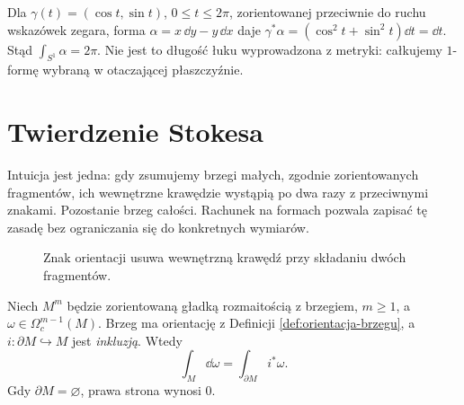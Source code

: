 \begin{przyklad}
Dla $\gamma(t)=(\cos t,\sin t)$, $0\leq t\leq2\pi$,
zorientowanej przeciwnie do ruchu wskazówek zegara,
forma $\alpha=x\,\dd y-y\,\dd x$ daje
$\gamma^*\alpha=(\cos^2t+\sin^2t)\dd t=\dd t$.
Stąd $\int_{S^1}\alpha=2\pi$.
Nie jest to długość łuku wyprowadzona z metryki:
całkujemy $1$-formę wybraną w otaczającej płaszczyźnie.
\end{przyklad}

\section{Twierdzenie Stokesa}
\label{sec:formy-stokes}

Intuicja jest jedna: gdy zsumujemy brzegi
małych, zgodnie zorientowanych fragmentów,
ich wewnętrzne krawędzie wystąpią po dwa razy
z przeciwnymi znakami. Pozostanie brzeg całości.
Rachunek na formach pozwala zapisać tę zasadę
bez ograniczania się do konkretnych wymiarów.

\begin{figure}[!htbp]
\centering
{}
\caption{Znak orientacji usuwa wewnętrzną krawędź
przy składaniu dwóch fragmentów.}
\label{fig:stokes-anulowanie}
\end{figure}

\begin{twierdzenie}
\label{thm:stokes-formy}
Niech $M^m$ będzie zorientowaną gładką rozmaitością
z brzegiem, $m\geq1$, a $\omega\in\Omega_c^{m-1}(M)$.
Brzeg ma orientację z Definicji
\ref{def:orientacja-brzegu}, a
$i:\partial M\hookrightarrow M$ jest \emph{inkluzją}.
Wtedy
\begin{equation}\label{eq:stokes-formy}
 \boxed{\displaystyle \int_M\dd\omega
        =\int_{\partial M}i^*\omega.}
\end{equation}
Gdy $\partial M=\varnothing$, prawa strona wynosi $0$.
\end{twierdzenie}

